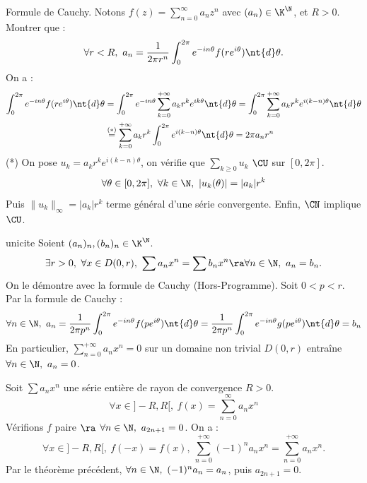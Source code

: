 \documentclass[11pt]{article}
\begin{document}
\begin{exercice}{Formule de Cauchy.}{}
    Notons $f(z)=\sum_{n=0}^\infty a_nz^n$ avec $(a_n)\in\K^\N$, et $R>0$. Montrer que :
    \begin{equation*}
        \forall r < R, ~ a_n = \frac{1}{2\pi r^n} \int_0^{2\pi} e^{-in\theta} f(re^{i\theta})\nt{d}\theta.
    \end{equation*}
    \tcblower
    On a :
    \begin{align*}
        \int_0^{2\pi}e^{-in\theta}f(re^{i\theta})\nt{d}\theta &= \int_0^{2\pi}e^{-in\theta}\sum_{k=0}^{+\infty}a_k r^ke^{ik\theta} \nt{d}\theta = \int_0^{2\pi}\sum_{k=0}^{+\infty}a_kr^ke^{i(k-n)\theta}\nt{d}\theta\\
        &\overset{(*)}{=}\sum_{k=0}^{+\infty}a_kr^k\int_0^{2\pi}e^{i(k-n)\theta}\nt{d}\theta=2\pi a_n r^n
    \end{align*}
    (*) On pose $u_k=a_kr^ke^{i(k-n)\theta}$, on vérifie que $\sum_{k\geq0}u_k$ $\CU$ sur $[0,2\pi]$.
    \begin{equation*}
        \forall \theta \in [0,2\pi], ~ \forall k \in \N, ~ |u_k(\theta)|=|a_k|r^k
    \end{equation*}
    Puis $\|u_k\|_\infty=|a_k|r^k$ terme général d'une série convergente. Enfin, $\CN$ implique $\CU$.
\end{exercice}

\vspace*{-0.8cm}

\begin{prop}{}{unicite}
    Soient $(a_n)_n,(b_n)_n\in\K^\N$. 
    \begin{equation*} \exists r > 0, ~ \forall x \in D(0,r), ~ \sum a_nx^
        n = \sum b_nx^n \ra \forall n \in \N, ~ a_n=b_n. \end{equation*}
    \tcblower
    On le démontre avec la formule de Cauchy (Hors-Programme).
    Soit $0<p<r$. Par la formule de Cauchy :
    \begin{equation*}
        \forall n \in \N, ~ a_n = \frac{1}{2\pi p^n}\int_0^{2\pi}e^{-in\theta}f(pe^{i\theta})\nt{d}\theta = \frac{1}{2\pi p^n}\int_0^{2\pi}e^{-in\theta}g(pe^{i\theta})\nt{d}\theta = b_n
    \end{equation*}
    En particulier, $\sum_{n=0}^{+\infty}a_nx^n=0$ sur un domaine non trivial $D(0,r)$ entraîne $\forall n \in \N, ~ a_n = 0$.
\end{prop}

\vspace*{-0.8cm}

\begin{ex}{}{}
    Soit $\sum a_nx^n$ une série entière de rayon de convergence $R>0$.
    \begin{equation*}
        \forall x \in ]-R, R[, ~ f(x) = \sum_{n=0}^\infty a_n x^n
    \end{equation*}
    Vérifions $f$ paire $\ra$ $\forall n \in \N, ~ a_{2n+1}=0$.
    \tcblower
    On a :
    \begin{equation*}
        \forall x \in ]-R,R[, ~ f(-x)=f(x), ~ \sum_{n=0}^{+\infty}(-1)^na_nx^n = \sum_{n=0}^{+\infty}a_nx^n.
    \end{equation*}
    Par le théorème précédent, $\forall n \in \N, ~ (-1)^na_n = a_n$, puis $a_{2n+1}=0$.
\end{ex}
\end{document}
